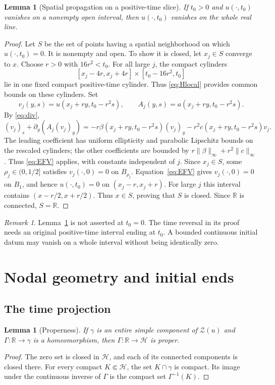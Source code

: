 \documentclass[11pt,reqno]{amsart}
\numberwithin{equation}{section}
\newtheorem{lemma}[theorem]{Lemma}
\theoremstyle{definition}
\theoremstyle{remark}
\newtheorem{remark}[theorem]{Remark}
\newcommand{\R}{\mathbb R}
\newcommand{\HH}{\mathcal H}
\newcommand{\ZZ}{\mathcal Z}
\begin{document}
\begin{lemma}[Spatial propagation on a positive-time slice]\label{lem:slice}
If $t_0>0$ and $u(\cdot,t_0)$ vanishes on a nonempty open interval, then $u(\cdot,t_0)$ vanishes on the whole real line.
\end{lemma}
\begin{proof}
Let $S$ be the set of points having a spatial neighborhood on which $u(\cdot,t_0)=0$. It is nonempty and open. To show it is closed, let $x_j\in S$ converge to $x$. Choose $r>0$ with $16r^2<t_0$. For all large $j$, the compact cylinders
\[
 [x_j-4r,x_j+4r]\times[t_0-16r^2,t_0]
\]
lie in one fixed compact positive-time cylinder. Thus \eqref{eq:Hlocal} provides common bounds on these cylinders. Set
\[
 v_j(y,s)=u(x_j+ry,t_0-r^2s),\qquad
 A_j(y,s)=a(x_j+ry,t_0-r^2s).
\]
By \eqref{eq:div},
\[
 (v_j)_s+\partial_y(A_j(v_j)_y)
 =-r\beta(x_j+ry,t_0-r^2s)(v_j)_y
  -r^2c(x_j+ry,t_0-r^2s)v_j.
\]
The leading coefficient has uniform ellipticity and parabolic
Lipschitz bounds on the rescaled cylinders; the other coefficients
are bounded by $r\|\beta\|_\infty+r^2\|c\|_\infty$.
Thus \eqref{eq:EFV} applies, with constants independent of $j$.
Since $x_j\in S$, some $\rho_j\in(0,1/2]$ satisfies $v_j(\cdot,0)=0$ on $B_{\rho_j}$. Equation~\eqref{eq:EFV} gives $v_j(\cdot,0)=0$ on $B_1$, and hence $u(\cdot,t_0)=0$ on $(x_j-r,x_j+r)$. For large $j$ this interval contains $(x-r/2,x+r/2)$. Thus $x\in S$, proving that $S$ is closed. Since $\R$ is connected, $S=\R$.
\end{proof}

\begin{remark}\label{rem:notinitial}
Lemma~\ref{lem:slice} is not asserted at $t_0=0$. The time reversal in its proof needs an original positive-time interval ending at $t_0$. A bounded continuous initial datum may vanish on a whole interval without being identically zero.
\end{remark}

\section{Nodal geometry and initial ends}\label{sec:geometry}
\subsection{The time projection}
\begin{lemma}[Properness]\label{lem:proper}
If $\gamma$ is an entire simple component of $\ZZ(u)$ and $\Gamma:\R\to\gamma$ is a homeomorphism, then $\Gamma:\R\to\HH$ is proper.
\end{lemma}
\begin{proof}
The zero set is closed in $\HH$, and each of its connected components is closed there. For every compact $K\Subset\HH$, the set $K\cap\gamma$ is compact. Its image under the continuous inverse of $\Gamma$ is the compact set $\Gamma^{-1}(K)$.
\end{proof}
\end{document}
